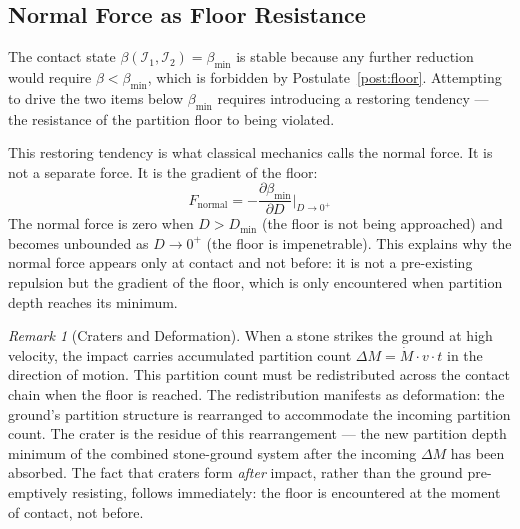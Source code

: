 \documentclass[11pt,twocolumn,a4paper]{article}
\theoremstyle{plain}
\theoremstyle{definition}
\theoremstyle{remark}
\newtheorem{remark}[theorem]{Remark}
\begin{document}
\subsection{Normal Force as Floor Resistance}
\label{subsec:normal}

The contact state $\beta(\mathcal{I}_1, \mathcal{I}_2) = \beta_{\min}$ is
stable because any further reduction would require $\beta < \beta_{\min}$, which
is forbidden by Postulate~\ref{post:floor}. Attempting to drive the two items
below $\beta_{\min}$ requires introducing a restoring tendency --- the resistance
of the partition floor to being violated.

This restoring tendency is what classical mechanics calls the normal force. It
is not a separate force. It is the gradient of the floor:
\begin{equation}
    F_{\mathrm{normal}} = -\frac{\partial \beta_{\min}}{\partial D}
    \bigg|_{D \to 0^+}
    \label{eq:normal}
\end{equation}
The normal force is zero when $D > D_{\min}$ (the floor is not being approached)
and becomes unbounded as $D \to 0^+$ (the floor is impenetrable). This explains
why the normal force appears only at contact and not before: it is not a
pre-existing repulsion but the gradient of the floor, which is only encountered
when partition depth reaches its minimum.

\begin{remark}[Craters and Deformation]
\label{rem:craters}
When a stone strikes the ground at high velocity, the impact carries accumulated
partition count $\Delta M = \dot{M} \cdot v \cdot t$ in the direction of motion.
This partition count must be redistributed across the contact chain when the
floor is reached. The redistribution manifests as deformation: the ground's
partition structure is rearranged to accommodate the incoming partition count.
The crater is the residue of this rearrangement --- the new partition depth
minimum of the combined stone-ground system after the incoming $\Delta M$ has
been absorbed. The fact that craters form \emph{after} impact, rather than the
ground pre-emptively resisting, follows immediately: the floor is encountered at
the moment of contact, not before.
\end{remark}
\end{document}
